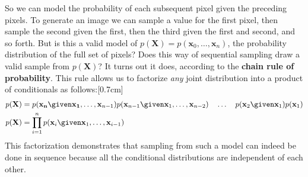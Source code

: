 So we can model the probability of each subsequent pixel given the preceding pixels. To generate an image we can sample a value for the first pixel, then sample the second given the first, then the third given the first and second, and so forth. But is this a valid model of $p(\mathbf{X}) = p(\mathbf{x}_0, \ldots, \mathbf{x}_n)$, the probability distribution of the full set of pixels? Does this way of sequential sampling draw a valid sample from $p(\mathbf{X})$? It turns out it does, according to the {\bf chain rule of probability}. This rule allows us to factorize \textit{any} joint distribution into a product of conditionals as follows:[0.7cm]
\begin{align}
    p(\mathbf{X}) &= p(\mathbf{x_n} \given \mathbf{x_1}, \ldots, \mathbf{x}_{n-1})p(\mathbf{x}_{n-1} \given \mathbf{x}_1, \ldots, \mathbf{x}_{n-2}) \quad \ldots \quad p(\mathbf{x}_2 \given \mathbf{x}_1)p(\mathbf{x}_1)\\
    p(\mathbf{X}) &= \prod_{i=1}^n p(\mathbf{x}_i \given \mathbf{x}_1, \ldots, \mathbf{x}_{i-1})\label{eqn:generative_models:autoregressive_likelihood}
\end{align}
This factorization demonstrates that sampling from such a model can indeed be done in sequence because all the conditional distributions are independent of each other. %


